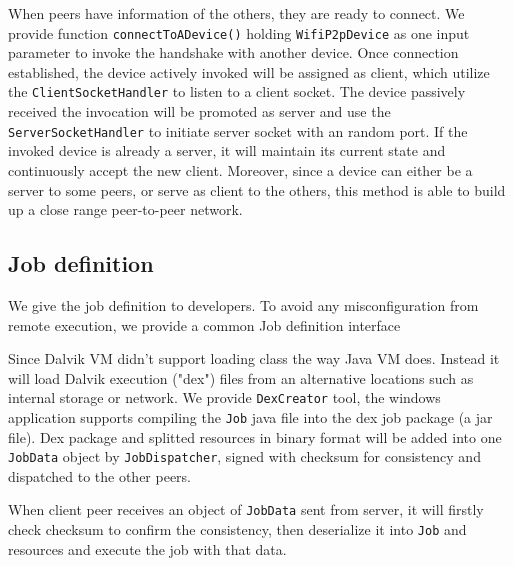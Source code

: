 \documentclass[conference]{IEEEtran}
\begin{document}
When peers have information of the others, they are ready to connect. We provide function \texttt{connectToADevice()} holding \texttt{WifiP2pDevice} as one input parameter to invoke the handshake with another device. Once connection established, the device actively invoked will be assigned as client, which utilize the \texttt{ClientSocketHandler} to listen to a client socket. The device passively received the invocation will be promoted as server and use the \texttt{ServerSocketHandler} to initiate server socket with an random port. If the invoked device is already a server, it will maintain its current state and continuously accept the new client. Moreover, since a device can either be a server to some peers, or serve as client to the others, this method is able to build up a close range peer-to-peer network.

\subsection{Job definition} \label{job-description}
We give the job definition to developers. To avoid any misconfiguration from remote execution, we provide a common Job definition interface

\noindent {}	

Since Dalvik VM didn't support loading class the way Java VM does. Instead it will load Dalvik execution ("dex") files from an alternative locations such as internal storage or network. We provide \texttt{DexCreator} tool, the windows application supports compiling the \texttt{Job} java file into the dex job package (a jar file). Dex package and splitted resources in binary format will be added into one \texttt{JobData} object by \texttt{JobDispatcher}, signed with checksum for consistency and dispatched to the other peers.

When client peer receives an object of \texttt{JobData} sent from server, it will firstly check checksum to confirm the consistency, then deserialize it into \texttt{Job} and resources and execute the job with that data.
\end{document}
